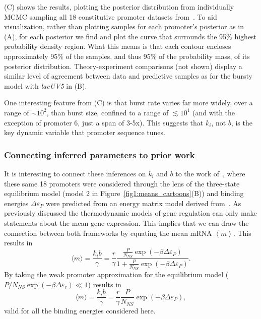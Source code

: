 (C) shows the results, plotting the posterior
distribution from individually MCMC sampling all 18 constitutive promoter
datasets from~\cite{Jones2014}. To aid visualization, rather than plotting
samples for each promoter's posterior as in (A), for
each posterior we find and plot the curve that surrounds the 95\% highest
probability density region. What this means is that each contour 
encloses approximately 95\% of the samples, and thus 95\% of the probability
mass, of its posterior distribution. Theory-experiment comparisons (not shown)
display a similar level of agreement between data and predictive samples as for
the bursty model with \textit{lacUV5} in (B).

One interesting feature from (C) is that burst rate
varies far more widely, over a range of $\sim10^2$, than burst size, confined to
a range of $\lesssim10^1$ (and with the exception of promoter 6, just a span of
3-5x). This suggests that $k_i$, not $b$, is the key dynamic variable that
promoter sequence tunes.

\subsubsection{Connecting inferred parameters to prior work}
It is interesting to connect these inferences on $k_i$ and $b$ to the work
of~\cite{Brewster2012}, where these same 18 promoters were considered through
the lens of the three-state equilibrium model (model 2 in
Figure~\ref{fig1:means_cartoons}(B)) and binding energies $\Delta\varepsilon_P$
were predicted from an energy matrix model derived from~\cite{Kinney2010}. As
previously discussed the thermodynamic models of gene regulation can only make
statements about the mean gene expression. This implies that we can draw the
connection between both frameworks by equating the mean mRNA $\left\langle m
\right\rangle$. This results in
\begin{equation}
\langle m \rangle = \frac{k_i b}{\gamma}
        = \frac{r}{\gamma}
        \frac{\frac{P}{N_{NS}}\exp(-\beta\Delta\varepsilon_P)}
                {1+\frac{P}{N_{NS}}\exp(-\beta\Delta\varepsilon_P)}.
\end{equation}
By taking the weak promoter approximation for the equilibrium model ($P/N_{NS} 
\exp(-\beta\Delta\varepsilon_r) \ll 1$) results in
\begin{equation}
\langle m \rangle = \frac{k_i b}{\gamma}
        = \frac{r}{\gamma} \frac{P}{N_{NS}}\exp(-\beta\Delta\varepsilon_P),
\end{equation}
valid for all the binding energies considered here.

